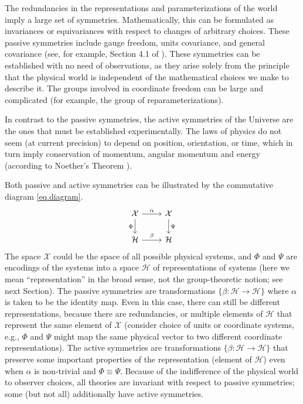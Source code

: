 \documentclass[11pt]{article}
\begin{document}
The redundancies in the representations and parameterizations of the world imply a large set of symmetries.
Mathematically, this can be formulated as invariances or equivariances with respect to changes of arbitrary choices.
These passive symmetries include gauge freedom, units covariance, and general covariance (see, for example, Section 4.1 of \cite{rovelli2000loop}).
These symmetries can be established with no need of observations, as they arise solely from the principle that the physical world is independent of the mathematical choices we make to describe it.
The groups involved in coordinate freedom can be large and complicated (for example, the group of reparameterizations).

In contrast to the passive symmetries, the active symmetries of the Universe are the ones that must be established experimentally.
The laws of physics do not seem (at current precision) to depend on position, orientation, or time, which in turn imply conservation of momentum, angular momentum and energy (according to Noether's Theorem \cite{noether}).

Both passive and active symmetries can be illustrated by the commutative diagram \eqref{eq.diagram}. 
\begin{equation}\label{eq.diagram}
\begin{tikzcd}[]
  {\cal X}\arrow[r,"\alpha"] \arrow[d,"\Phi",swap] & {\cal X}  \arrow[d,"\Psi"]\\
{\cal H} \arrow[r,"\beta"]  & {\cal H} 
\end{tikzcd}
\end{equation}
The space $\mathcal X$ could be the space of all possible physical systems, and $\Phi$ and $\Psi$ are encodings of the systems into a space $\mathcal H$ of representations of systems (here we mean ``representation'' in the broad sense, not the group-theoretic notion; see next Section).
The passive symmetries are transformations $\{\beta:\mathcal H \to \mathcal H\}$ where $\alpha$ is taken to be the identity map.
Even in this case, there can still be different representations, because there are redundancies, or multiple elements of $\mathcal H$ that represent the same element of $\mathcal X$ (consider choice of units or coordinate systems, e.g., $\Phi$ and $\Psi$ might map the same physical vector to two different coordinate representations).
The active symmetries are transformations $\{\beta:\mathcal H \to \mathcal H\}$ that preserve some important properties of the representation (element of $\mathcal H$) even when $\alpha$ is non-trivial and $\Phi\equiv \Psi$.
Because of the indifference of the physical world to observer choices, all theories are invariant with respect to passive symmetries; some (but not all) additionally have active symmetries.
\end{document}
